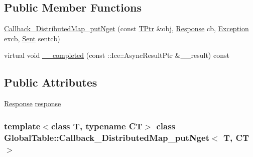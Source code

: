 \subsection*{Public Member Functions}
\begin{DoxyCompactItemize}
\item 
\hyperlink{class_global_table_1_1_callback___distributed_map__put_nget_ae7d20531c175006422ca74fc388d296f}{Callback\_\-DistributedMap\_\-putNget} (const \hyperlink{class_global_table_1_1_callback___distributed_map__put_nget_a037a94498b05c6b5fc70ba285bc371d3}{TPtr} \&obj, \hyperlink{class_global_table_1_1_callback___distributed_map__put_nget_a2cc52cb4955940f3e037371ca7cb6b08}{Response} cb, \hyperlink{class_global_table_1_1_callback___distributed_map__put_nget_a48bbaf406f2d2808978aae28a5d97fec}{Exception} excb, \hyperlink{class_global_table_1_1_callback___distributed_map__put_nget_a66e1df0479df703206b863c898f0d9dd}{Sent} sentcb)
\item 
virtual void \hyperlink{class_global_table_1_1_callback___distributed_map__put_nget_a41d8c24bfa34d63f0ad78437cfbe5d45}{\_\-\_\-completed} (const ::Ice::AsyncResultPtr \&\_\-\_\-result) const 
\end{DoxyCompactItemize}
\subsection*{Public Attributes}
\begin{DoxyCompactItemize}
\item 
\hyperlink{class_global_table_1_1_callback___distributed_map__put_nget_a2cc52cb4955940f3e037371ca7cb6b08}{Response} \hyperlink{class_global_table_1_1_callback___distributed_map__put_nget_af25c8b9d7ac55cc8a5df907bc0dab9ad}{response}
\end{DoxyCompactItemize}
\subsubsection*{template$<$class T, typename CT$>$ class GlobalTable::Callback\_\-DistributedMap\_\-putNget$<$ T, CT $>$}



